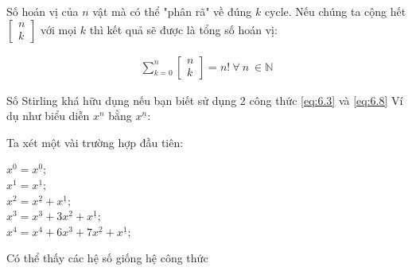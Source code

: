 Số hoán vị của $n$ vật mà có thể "phân rã" về đúng $k$ cycle.
Nếu chúng ta cộng hết $\begin{bmatrix} n \\ k \end{bmatrix}$ với mọi $k$ thì kết quả sẽ được 
là tổng số hoán vị:

\begin{equation}
    \begin{aligned}
        \sum_{k = 0}^n \begin{bmatrix} n \\ k \end{bmatrix} = n! 
        \ \forall \ n \ \in \mathbb{N}
    \end{aligned} \label{eq:6.9}
\end{equation}

\newcommand{\fallingfactorial}[1]{%
  ^{\underline{#1}}%
}

\newcommand{\raisingfactorial}[1]{%
  ^{\mspace{2mu}\overline{\mspace{-2mu}#1\mspace{-2mu}}\mspace{2mu}}%
}

Số Stirling khá hữu dụng nếu bạn biết sử dụng 2 công thức \eqref{eq:6.3} và \eqref{eq:6.8}
Ví dụ như biểu diễn $x^n$ bằng $x\fallingfactorial{n}$:

Ta xét một vài trường hợp đầu tiên:

$x^0 = x\fallingfactorial{0};$ \\
\indent $x^1 = x\fallingfactorial{1};$ \\
\indent $x^2 = x\fallingfactorial{2} + x\fallingfactorial{1};$ \\
\indent $x^3 = x\fallingfactorial{3} + 3x\fallingfactorial{2} + x\fallingfactorial{1};$ \\
\indent $x^4 = x\fallingfactorial{4} + 6x\fallingfactorial{3} + 7x\fallingfactorial{2} + x\fallingfactorial{1};$

Có thể thấy các hệ số giống hệ công thức    